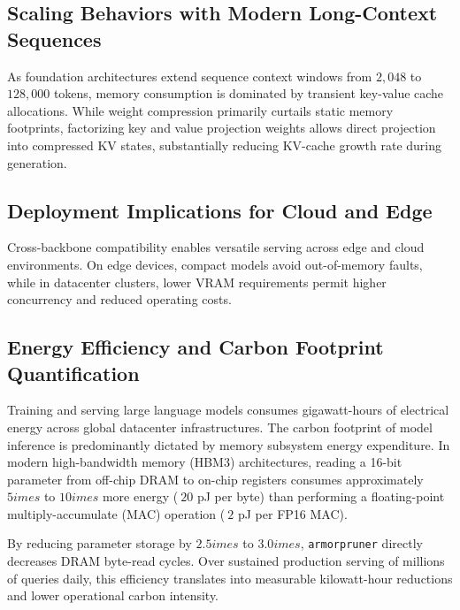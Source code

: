 \subsection{Scaling Behaviors with Modern Long-Context Sequences}
As foundation architectures extend sequence context windows from $2{,}048$ to $128{,}000$ tokens, memory consumption is dominated by transient key-value cache allocations. While weight compression primarily curtails static memory footprints, factorizing key and value projection weights allows direct projection into compressed KV states, substantially reducing KV-cache growth rate during generation.

\subsection{Deployment Implications for Cloud and Edge}
Cross-backbone compatibility enables versatile serving across edge and cloud environments. On edge devices, compact models avoid out-of-memory faults, while in datacenter clusters, lower VRAM requirements permit higher concurrency and reduced operating costs.

\subsection{Energy Efficiency and Carbon Footprint Quantification}
Training and serving large language models consumes gigawatt-hours of electrical energy across global datacenter infrastructures. The carbon footprint of model inference is predominantly dictated by memory subsystem energy expenditure. In modern high-bandwidth memory (HBM3) architectures, reading a 16-bit parameter from off-chip DRAM to on-chip registers consumes approximately $5	imes$ to $10	imes$ more energy ($~20$ pJ per byte) than performing a floating-point multiply-accumulate (MAC) operation ($~2$ pJ per FP16 MAC).

By reducing parameter storage by $2.5	imes$ to $3.0	imes$, \texttt{armorpruner} directly decreases DRAM byte-read cycles. Over sustained production serving of millions of queries daily, this efficiency translates into measurable kilowatt-hour reductions and lower operational carbon intensity.
